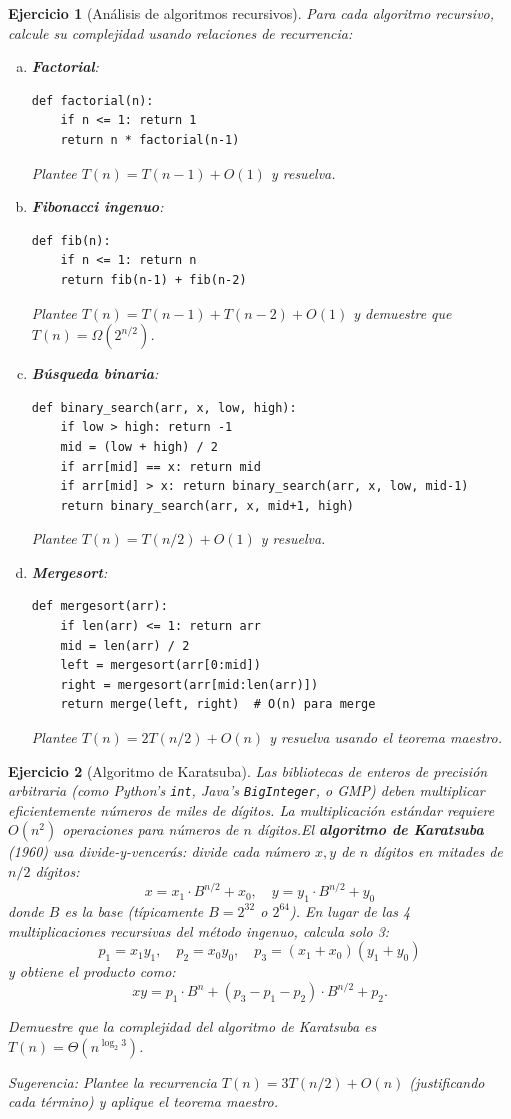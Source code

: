 \documentclass[12pt]{article}
\newtheorem{exercise}{Ejercicio}
\begin{document}
\begin{exercise}[Análisis de algoritmos recursivos]
Para cada algoritmo recursivo, calcule su complejidad usando relaciones de recurrencia:
\begin{enumerate}[(a)]
\item \textbf{Factorial}:
\begin{verbatim}
def factorial(n):
    if n <= 1: return 1
    return n * factorial(n-1)
\end{verbatim}
Plantee $T(n) = T(n-1) + O(1)$ y resuelva.

\item \textbf{Fibonacci ingenuo}:
\begin{verbatim}
def fib(n):
    if n <= 1: return n
    return fib(n-1) + fib(n-2)
\end{verbatim}
Plantee $T(n) = T(n-1) + T(n-2) + O(1)$ y demuestre que $T(n) = \Omega(2^{n/2})$.

\item \textbf{Búsqueda binaria}:
\begin{verbatim}
def binary_search(arr, x, low, high):
    if low > high: return -1
    mid = (low + high) / 2
    if arr[mid] == x: return mid
    if arr[mid] > x: return binary_search(arr, x, low, mid-1)
    return binary_search(arr, x, mid+1, high)
\end{verbatim}
Plantee $T(n) = T(n/2) + O(1)$ y resuelva.

\item \textbf{Mergesort}:
\begin{verbatim}
def mergesort(arr):
    if len(arr) <= 1: return arr
    mid = len(arr) / 2
    left = mergesort(arr[0:mid])
    right = mergesort(arr[mid:len(arr)])
    return merge(left, right)  # O(n) para merge
\end{verbatim}
Plantee $T(n) = 2T(n/2) + O(n)$ y resuelva usando el teorema maestro.
\end{enumerate}
\end{exercise}

\begin{exercise}[Algoritmo de Karatsuba]
Las bibliotecas de enteros de precisión arbitraria (como Python's \texttt{int}, Java's \texttt{BigInteger}, o GMP) deben multiplicar eficientemente números de miles de dígitos. La multiplicación estándar requiere $O(n^2)$ operaciones para números de $n$ dígitos.El \textbf{algoritmo de Karatsuba} (1960) usa divide-y-vencerás: divide cada número $x, y$ de $n$ dígitos en mitades de $n/2$ dígitos:
\[
x = x_1 \cdot B^{n/2} + x_0, \quad y = y_1 \cdot B^{n/2} + y_0
\]
donde $B$ es la base (típicamente $B = 2^{32}$ o $2^{64}$). En lugar de las 4 multiplicaciones recursivas del método ingenuo, calcula solo 3:
\[
p_1 = x_1 y_1, \quad p_2 = x_0 y_0, \quad p_3 = (x_1 + x_0)(y_1 + y_0)
\]
y obtiene el producto como:
\[
xy = p_1 \cdot B^n + (p_3 - p_1 - p_2) \cdot B^{n/2} + p_2.
\]

Demuestre que la complejidad del algoritmo de Karatsuba es $T(n) = \Theta(n^{\log_2 3})$.

\textit{Sugerencia}: Plantee la recurrencia $T(n) = 3T(n/2) + O(n)$ (justificando cada término) y aplique el teorema maestro.
\end{exercise}
\end{document}
